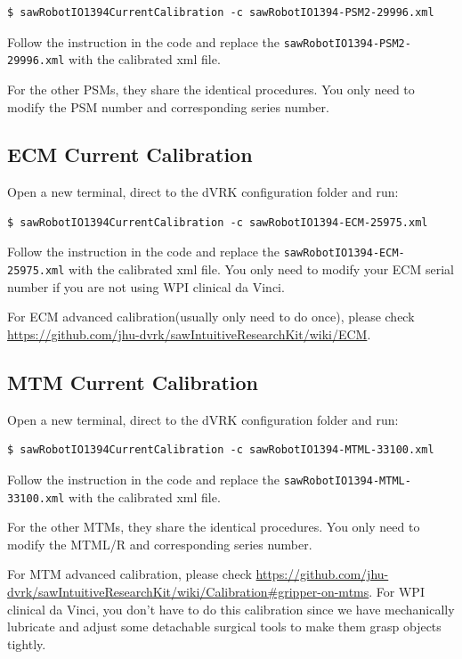 \begin{verbatim}
$ sawRobotIO1394CurrentCalibration -c sawRobotIO1394-PSM2-29996.xml 
\end{verbatim}

Follow the instruction in the code and replace the \texttt{sawRobotIO1394-PSM2-29996.xml} with the calibrated xml file.

For the other PSMs, they share the identical procedures. You only need to modify the PSM number and corresponding series number.

\subsection{ECM Current Calibration}

Open a new terminal, direct to the dVRK configuration folder and run:

\begin{verbatim}
$ sawRobotIO1394CurrentCalibration -c sawRobotIO1394-ECM-25975.xml 
\end{verbatim}

Follow the instruction in the code and replace the \texttt{sawRobotIO1394-ECM-25975.xml} with the calibrated xml file. You only need to modify your ECM serial number if you are not using WPI clinical da Vinci.

For ECM advanced calibration(usually only need to do once), please check \url{https://github.com/jhu-dvrk/sawIntuitiveResearchKit/wiki/ECM}.

\subsection{MTM Current Calibration}

Open a new terminal, direct to the dVRK configuration folder and run:

\begin{verbatim}
$ sawRobotIO1394CurrentCalibration -c sawRobotIO1394-MTML-33100.xml 
\end{verbatim}

Follow the instruction in the code and replace the \texttt{sawRobotIO1394-MTML-33100.xml} with the calibrated xml file.

For the other MTMs, they share the identical procedures. You only need to modify the MTML/R and corresponding series number.

For MTM advanced calibration, please check \url{https://github.com/jhu-dvrk/sawIntuitiveResearchKit/wiki/Calibration#gripper-on-mtms}. For WPI clinical da Vinci, you don't have to do this calibration since we have mechanically lubricate and adjust some detachable surgical tools to make them grasp objects tightly.

